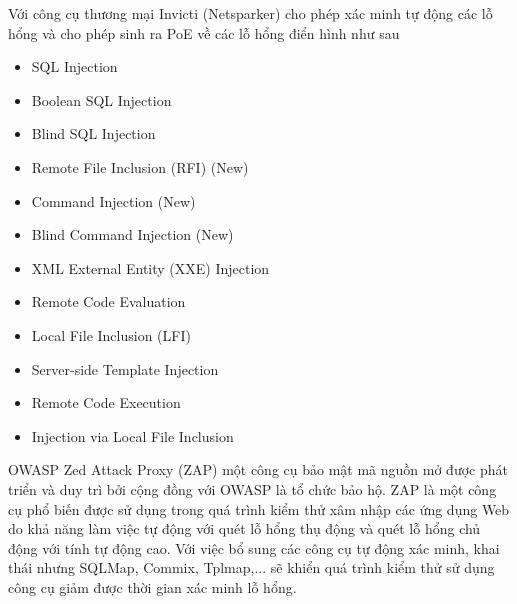 \documentclass[./../main.tex]{subfiles}
\begin{document}
Với công cụ thương mại Invicti (Netsparker) cho phép xác minh tự động các lỗ hổng
và cho phép sinh ra PoE về các lỗ hổng điển hình như sau
\begin{itemize}
	\item SQL Injection
	\item Boolean SQL Injection
	\item Blind SQL Injection
	\item Remote File Inclusion (RFI) (New)
	\item Command Injection (New)
	\item Blind Command Injection (New)
	\item XML External Entity (XXE) Injection
	\item Remote Code Evaluation
	\item Local File Inclusion (LFI)
	\item Server-side Template Injection
	\item Remote Code Execution
	\item Injection via Local File Inclusion
\end{itemize}

OWASP Zed Attack Proxy (ZAP) một công cụ bảo mật mã nguồn mở được phát triển và duy trì bởi cộng đồng với OWASP là tổ chức bảo hộ. ZAP là một công cụ phổ biến được sử dụng trong quá trình kiểm thử xâm nhập các ứng dụng Web do khả năng làm việc tự động với quét lỗ hổng thụ động và quét lỗ hổng chủ động với tính tự động cao. Với việc bổ sung các công cụ tự động xác minh, khai thái nhưng SQLMap, Commix, Tplmap,... sẽ khiển quá trình kiểm thử sử dụng công cụ giảm được thời gian xác minh lỗ hổng.
\end{document}
